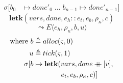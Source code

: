 \documentclass[12pt,draft]{article}
\newcommand\mdoubleplus{\ensuremath{\mathbin{+\mkern-9mu+}}}
\begin{document}
\begin{multicols*}{2}
\begin{align*}
\sigma[b_0 &\mapsto done'_0\;...\;b_{n-1} \mapsto done'_{n-1}]
\end{align*}
\[
\textbf{letk}(vars, done, e_h::e_t, e_b , \rho_{\kappa}, c)
\]
\vspace{-7mm}
\[
\leadsto
E\langle
e_h , \rho_{\kappa} , b , u
\rangle
\]
\vspace{-10mm}
\begin{align*}
\text{where } b &\triangleq alloc(\varsigma, 0) \\
u &\triangleq tick(\varsigma, 1) \\
\sigma[b &\mapsto \textbf{letk}(vars, done \mdoubleplus [v], \\
&\;\;\;\;\;\;\;\;\;\;\;\;\;\; e_t , e_b , \rho_{\kappa} , c)]
\end{align*}

\vfill\null
\columnbreak



\end{multicols*}
\end{document}
